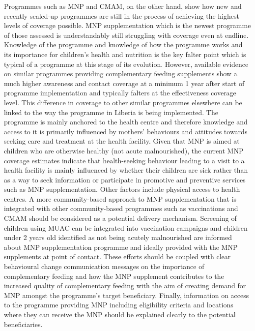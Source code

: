 \documentclass[12pt,a4paper]{article}
\begin{document}
Programmes such as MNP and CMAM, on the other hand, show how new and recently scaled-up programmes are still in the process of achieving the highest levels of coverage possible. MNP supplementation which is the newest programme of those assessed is understandably still struggling with coverage even at endline. Knowledge of the programme and knowledge of how the programme works and its importance for children's health and nutrition is the key falter point which is typical of a programme at this stage of its evolution. However, available evidence on similar programmes providing complementary feeding supplements show a much higher awareness and contact coverage at a minimum 1 year after start of programme implementation and typically falters at the effectiveness coverage level. This difference in coverage to other similar programmes elsewhere can be linked to the way the programme in Liberia is being implemented. The programme is mainly anchored to the health centre and therefore knowledge and access to it is primarily influenced by mothers' behaviours and attitudes towards seeking care and treatment at the health facility. Given that MNP is aimed at children who are otherwise healthy (not acute malnourished), the current MNP coverage estimates indicate that health-seeking behaviour leading to a visit to a health facility is mainly influenced by whether their children are sick rather than as a way to seek information or participate in promotive and preventive services such as MNP supplementation. Other factors include physical access to health centres. A more community-based approach to MNP supplementation that is integrated with other community-based programmes such as vaccinations and CMAM should be considered as a potential delivery mechanism. Screening of children using MUAC can be integrated into vaccination campaigns and children under 2 years old identified as not being acutely malnourished are informed about MNP supplementation programme and ideally provided with the MNP supplements at point of contact. These efforts should be coupled with clear behavioural change communication messages on the importance of complementary feeding and how the MNP supplement contributes to the increased quality of complementary feeding with the aim of creating demand for MNP amongst the programme's target beneficiary. Finally, information on access to the programme providing MNP including eligibility criteria and locations where they can receive the MNP should be explained clearly to the potential beneficiaries.
\end{document}
